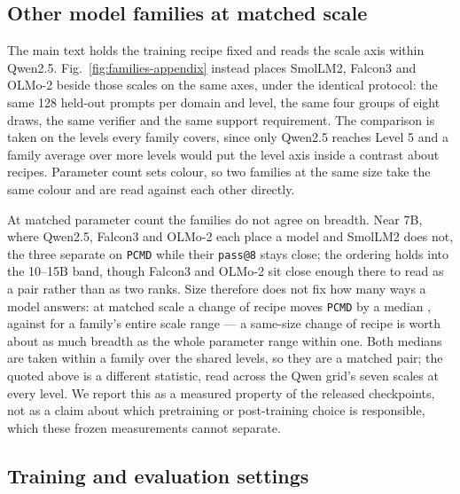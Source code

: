 \documentclass{article}
\newcommand{\1}{\mathbf 1}
\newcommand{\pmd}{\texttt{PCMD}}
\theoremstyle{remark}
\theoremstyle{definition}
\theoremstyle{plain}
\begin{document}
\subsection{Other model families at matched scale}
\label{sec:families-appendix}

The main text holds the training recipe fixed and reads the scale axis within
Qwen2.5. Fig.~\ref{fig:families-appendix} instead places SmolLM2, Falcon3 and
OLMo-2 beside those scales on the same axes, under the identical protocol: the
same 128 held-out prompts per domain and level, the same four groups of eight
draws, the same verifier and the same support requirement. The comparison is
taken on the \MDcommonlevels{} levels every family covers, since only Qwen2.5
reaches Level 5 and a family average over more levels would put the level
axis inside a contrast about recipes. Parameter count sets
colour, so two families at the same size take the same colour and are read
against each other directly.

At matched parameter count the families do not agree on breadth. Near 7B,
where Qwen2.5, Falcon3 and OLMo-2 each place a model and SmolLM2 does not, the
three separate on \pmd{} while their \texttt{pass@8} stays close; the ordering
holds into the 10--15B band, though Falcon3 and OLMo-2 sit close enough there to
read as a pair rather than as two ranks. Size therefore does not fix how
many ways a model answers: at matched scale a change of recipe moves \pmd{} by a
median \MDrecipespan{}, against \MDwithinrecipespan{} for a family's entire
scale range --- a same-size change of recipe is worth about as much breadth as
the whole parameter range within one. Both medians are taken within a family
over the \MDcommonlevels{} shared levels, so they are a matched pair; the
\MDscalespan{} quoted above is a different statistic, read across the Qwen
grid's seven scales at every level. We report this as a measured property
of the released checkpoints, not as a claim about which pretraining or
post-training choice is responsible, which these frozen measurements cannot
separate.


\subsection{Training and evaluation settings}
\label{app:repro-run-contract}
\label{app:comparison-design}
\end{document}
